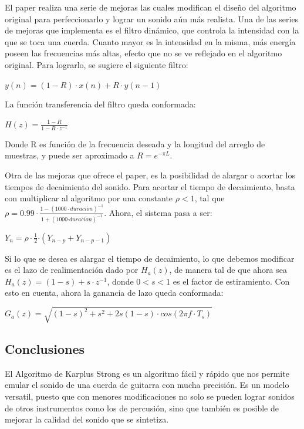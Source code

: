 \documentclass[../ASSD_TP2.tex]{subfiles}
\begin{document}
El paper realiza una serie de mejoras las cuales modifican el diseño
del algoritmo original para perfeccionarlo y lograr un sonido aún
más realista. Una de las series de mejoras que implementa es el filtro
dinámico, que controla la intensidad con la que se toca una cuerda.
Cuanto mayor es la intensidad en la misma, más energía poseen las
frecuencias más altas, efecto que no se ve reflejado en el algoritmo
original. Para lograrlo, se sugiere el siguiente filtro:
\begin{center}
$y(n)=(1-R)\cdot x(n)+R\cdot y(n-1)$
\par\end{center}

La función transferencia del filtro queda conformada:
\begin{center}
$H(z)=\frac{1-R}{1-R\cdot z^{-1}}$
\par\end{center}

Donde R es función de la frecuencia deseada y la longitud del arreglo
de muestras, y puede ser aproximado a $R=e^{-\pi L}$.

Otra de las mejoras que ofrece el paper, es la posibilidad de alargar
o acortar los tiempos de decaimiento del sonido. Para acortar el tiempo
de decaimiento, basta con multiplicar al algoritmo por una constante
$\rho<1$, tal que $\rho=0.99\cdot\frac{1-(1000\cdot duraci\acute{o}n)^{-1}}{1+(1000\text{·}duraci\acute{o}n)^{-1}}$.
Ahora, el sistema pasa a ser:
\begin{center}
$Y_{n}=\rho\cdot\frac{1}{2}\text{·}(Y_{n-p}+Y_{n-p-1})$
\par\end{center}

Si lo que se desea es alargar el tiempo de decaimiento, lo que debemos
modificar es el lazo de realimentación dado por $H_{a}(z)$, de manera
tal de que ahora sea $H_{a}(z)=(1-s)+s\cdot z^{-1}$, donde $0<s<1$
es el factor de estiramiento. Con esto en cuenta, ahora la ganancia
de lazo queda conformada:
\begin{center}
$G_{a}(z)=\sqrt{(1-s)^{2}+s^{2}+2s(1-s)\cdot cos(2\pi f\cdot T_{s})}$
\par\end{center}

\subsection{Conclusiones}

El Algoritmo de Karplus Strong es un algoritmo fácil y rápido que
nos permite emular el sonido de una cuerda de guitarra con mucha precisión.
Es un modelo versatil, puesto que con menores modificaciones no solo
se pueden lograr sonidos de otros instrumentos como los de percusión,
sino que también es posible de mejorar la calidad del sonido que se
sintetiza.
\end{document}
